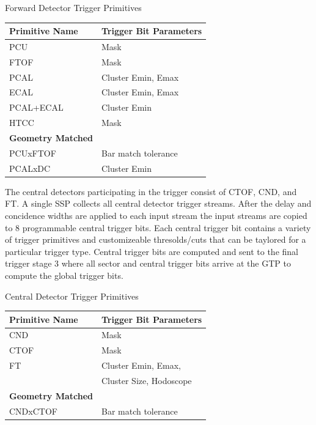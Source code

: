 \begin{center}
	Forward Detector Trigger Primitives\\
	\begin{tabular}{| l | l |}
		\hline \hline
		Primitive Name			& Trigger Bit Parameters	\\
		\hline
		PCU     			& Mask				\\
		FTOF    			& Mask				\\
		PCAL				& Cluster Emin, Emax		\\
		ECAL				& Cluster Emin, Emax		\\
		PCAL+ECAL			& Cluster Emin			\\
		HTCC				& Mask				\\
		{\bf Geometry Matched}		&				\\
		PCUxFTOF			& Bar match tolerance		\\
		PCALxDC				& Cluster Emin			\\
		\hline \hline
	\end{tabular}
\end{center}

The central detectors participating in the trigger consist of CTOF, CND, and FT. A single SSP collects all central detector trigger streams. After the delay and concidence widths are applied to each input stream the input streams are copied to 8 programmable central trigger bits. Each central trigger bit contains a variety of trigger primitives and customizeable thresolds/cuts that can be taylored for a particular trigger type. Central trigger bits are computed and sent to the final trigger stage 3 where all sector and central trigger bits arrive at the GTP to compute the global trigger bits.

\begin{center}
	Central Detector Trigger Primitives\\
	\begin{tabular}{| l | l |}
		\hline \hline
		Primitive Name			& Trigger Bit Parameters	\\
		\hline
		CND     			& Mask				\\
		CTOF    			& Mask				\\
		FT				& Cluster Emin, Emax, 		\\
						& Cluster Size, Hodoscope	\\
		{\bf Geometry Matched}		&				\\
		CNDxCTOF			& Bar match tolerance		\\
		\hline \hline
	\end{tabular}
\end{center}


